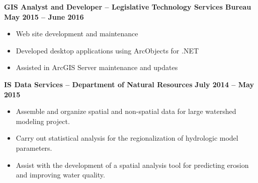 \documentclass{article}
\begin{document}
\begin{small}
	\noindent \textbf{GIS Analyst and Developer -- Legislative Technology Services Bureau} \hfill \textbf{May 2015 -- June 2016}
	\begin{itemize}
		\item Web site development and maintenance
		\item Developed desktop applications using ArcObjects for .NET
		\item Assisted in ArcGIS Server maintenance and updates
	\end{itemize}
	\noindent \textbf{IS Data Services -- Department of Natural Resources} \hfill \textbf{July 2014 -- May 2015}
	\begin{itemize}
		\item Assemble and organize spatial and non-spatial data for large watershed modeling project.
		\item Carry out statistical analysis for the regionalization of hydrologic model parameters. 
		\item Assist with the development of a spatial analysis tool 
		 for predicting erosion and improving water quality.
	\end{itemize}

\end{small}
\end{document}

